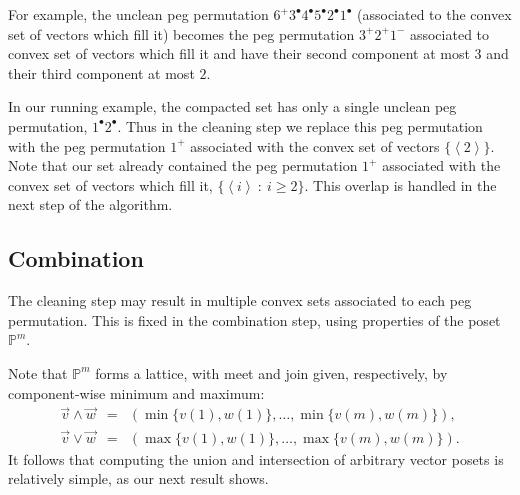 \documentclass[10pt]{article}
\theoremstyle{plain}
\theoremstyle{definition}
\newcommand{\vect}[1]{\left\langle #1 \right\rangle}
\newcommand{\st}{\::\:}
\newcommand{\p}[1]{#1^+}
\newcommand{\m}[1]{#1^-}
\renewcommand{\d}[1]{#1^{\bullet}}
\begin{document}
For example, the unclean peg permutation $\p 6 \d 3 \d 4 \d 5 \d 2 \d 1$ (associated to the convex set of vectors which fill it) becomes the peg permutation $\p 3 \p 2 \m 1$ associated to convex set of vectors which fill it and have their second component at most $3$ and their third component at most $2$. 

In our running example, the compacted set has only a single unclean peg permutation, $\d 1 \d 2$. Thus in the cleaning step we replace this peg permutation with the peg permutation $\p 1$ associated with the convex set of vectors $\{\vect{2}\}$. Note that our set already contained the peg permutation $\p 1$ associated with the convex set of vectors which fill it, $\{\vect{i}\st i\ge 2\}$. This overlap is handled in the next step of the algorithm.

%
%
%
%
%
%

\subsection{Combination}

The cleaning step may result in multiple convex sets associated to each peg permutation. This is fixed in the combination step, using properties of the poset $\mathbb{P}^m$. 

Note that $\mathbb{P}^m$ forms a lattice, with meet and join given, respectively, by component-wise minimum and maximum:
\begin{eqnarray*}
\vec{v}\wedge\vec{w}&=&(\min\{v(1),w(1)\},\dots,\min\{v(m),w(m)\}),\\
\vec{v}\vee\vec{w}&=&(\max\{v(1),w(1)\},\dots,\max\{v(m),w(m)\}).
\end{eqnarray*}
It follows that computing the union and intersection of arbitrary vector posets is relatively simple, as our next result shows.
\end{document}
